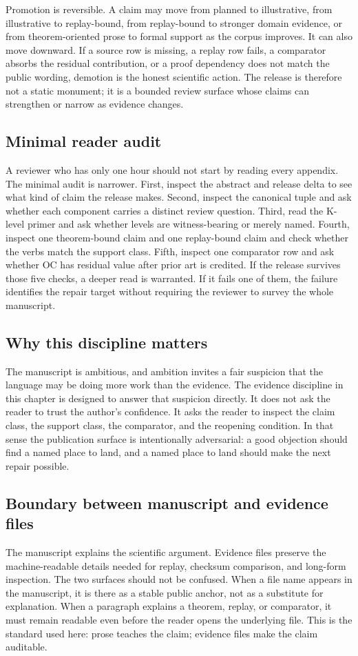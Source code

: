 Promotion is reversible. A claim may move from planned to illustrative, from
illustrative to replay-bound, from replay-bound to stronger domain evidence, or
from theorem-oriented prose to formal support as the corpus improves. It can
also move downward. If a source row is missing, a replay row fails, a comparator
absorbs the residual contribution, or a proof dependency does not match the
public wording, demotion is the honest scientific action. The release is
therefore not a static monument; it is a bounded review surface whose claims
can strengthen or narrow as evidence changes.

\subsection{Minimal reader audit}

A reviewer who has only one hour should not start by reading every appendix.
The minimal audit is narrower. First, inspect the abstract and release delta to
see what kind of claim the release makes. Second, inspect the canonical tuple
and ask whether each component carries a distinct review question. Third, read
the K-level primer and ask whether levels are witness-bearing or merely named.
Fourth, inspect one theorem-bound claim and one replay-bound claim and check
whether the verbs match the support class. Fifth, inspect one comparator row and
ask whether OC has residual value after prior art is credited. If the release
survives those five checks, a deeper read is warranted. If it fails one of them,
the failure identifies the repair target without requiring the reviewer to
survey the whole manuscript.

\subsection{Why this discipline matters}

The manuscript is ambitious, and ambition invites a fair suspicion that the
language may be doing more work than the evidence. The evidence discipline in
this chapter is designed to answer that suspicion directly. It does not ask the
reader to trust the author's confidence. It asks the reader to inspect the
claim class, the support class, the comparator, and the reopening condition. In
that sense the publication surface is intentionally adversarial: a good
objection should find a named place to land, and a named place to land should
make the next repair possible.

\subsection{Boundary between manuscript and evidence files}

The manuscript explains the scientific argument. Evidence files preserve the
machine-readable details needed for replay, checksum comparison, and long-form
inspection. The two surfaces should not be confused. When a file name appears
in the manuscript, it is there as a stable public anchor, not as a substitute
for explanation. When a paragraph explains a theorem, replay, or comparator, it
must remain readable even before the reader opens the underlying file. This is
the standard used here: prose teaches the claim; evidence files make the claim
auditable.
